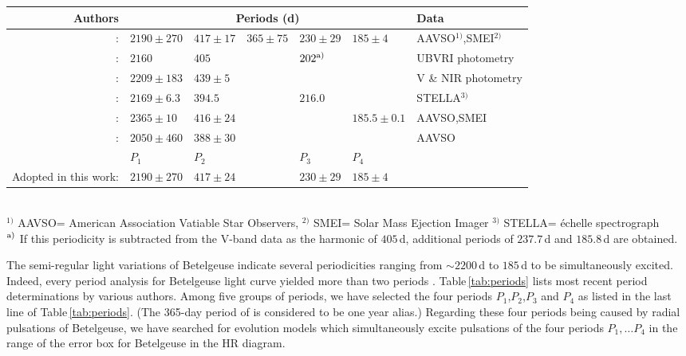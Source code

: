 \documentclass[fleqn,usenatbib]{mnras}
\begin{document}
\begin{table*}
	\centering
	\caption{Recent period determinations for light and radial-velocity curves of Betelgeuse and the adopted periods in this paper }
	\label{tab:periods}
	\begin{tabular}{rllllll} %
      \hline 
      Authors & \multicolumn{5}{c}{Periods (d)} & Data\\
      \hline
		\citet{Jadlovsky2023}: & $2190 \pm 270$ & $417 \pm 17$ & $365 \pm 75$ & $230 \pm 29$ & $185 \pm 4$ &AAVSO$^{1)}$,SMEI$^{2)}$\\
	\citet{Ogane2022}: & $2160$ & $405$ && $202^{\rm a)}$ & %
	& UBVRI photometry\\
	\citet{Wasatonic2022}: & $2209 \pm 183$ & $439 \pm 5$ & & & & V \& NIR photometry\\
     \citet{Granzer2022}: & $2169\pm 6.3$ & $394.5$ & & $216.0$ & & STELLA$^{3)}$\\
	 \citet{Joyce2020}: & $2365 \pm 10$ & $416\pm24$ &&& $185.5\pm0.1$ & AAVSO,SMEI\\
	\citet{Kiss2006}: & $2050\pm460$ & $388\pm 30$ &  &  & & AAVSO\\
      \hline
       & $P_1$ & $P_2$ & & $P_3$ & $P_4$ \\
      Adopted in this work: & $2190 \pm 270$ & $417 \pm 24$ & & $230 \pm 29$ & $185 \pm 4$ \\
		\hline
	\end{tabular}\\
 $^{1)}$ AAVSO= American Association Vatiable Star Observers, \quad
 $^{2)}$ SMEI= Solar Mass Ejection Imager \quad
 $^{3)}$ STELLA= \'echelle spectrograph \\
 $^{\rm a)}$ If this periodicity is subtracted from the V-band data 
 as the harmonic of $405$\,d,
additional periods of $237.7$\,d and $185.8$\,d are obtained. 
\end{table*}

The semi-regular light variations of Betelgeuse indicate several periodicities 
ranging from $\sim2200$\,d to $185$\,d to be simultaneously excited.
Indeed, every period analysis for Betelgeuse light curve yielded more 
than two periods
\citep{Jadlovsky2023,Ogane2022,Wasatonic2022,Granzer2022,Joyce2020,
Kiss2006,Stothers1971}.
Table\,\ref{tab:periods} lists most recent period determinations by various authors. 
Among five groups of periods, we have selected the four periods $P_1$,$P_2$,$P_3$ 
and $P_4$ as listed in the last line of Table\,\ref{tab:periods}.
(The 365-day period of \citet{Jadlovsky2023} is considered to be one year alias.)
Regarding these four periods being caused by radial pulsations of Betelgeuse,
we have searched for evolution models which simultaneously excite pulsations 
of the four periods $P_1, \ldots P_4$ in the range of the
error box for Betelgeuse in the HR diagram.
\end{document}
